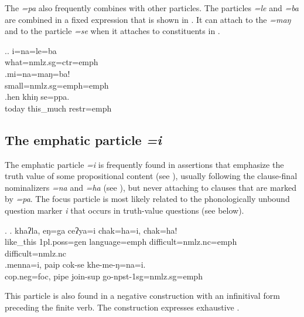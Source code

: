  The   \emph{=pa} also frequently combines with other particles. The particles \emph{=le} and \emph{=ba} are combined in a fixed expression that is shown in \Next[a]. It can attach to the  \emph{=maŋ} and to the  particle \emph{=se} when it attaches to constituents in .
 
 \ex.\ag. i=na=le=ba\\
 	what{\sc =nmlz.sg=ctr=emph}\\ 
 \bg.mi=na=maŋ=ba!\\
small{\sc =nmlz.sg=emph=emph}\\
  
 \bg.hen khiŋ se=ppa.\\
 today this\_much {\sc restr=emph}\\
 
\subsection{The emphatic particle \emph{=i}} 
\largerpage[-1] 
 The emphatic  particle \emph{=i} is frequently found  in assertions that emphasize the truth value of some propositional content (see \Next ), usually following the clause-final nominalizers \emph{=na} and \emph{=ha} (see ), but never attaching to clauses that are marked by \emph{=pa}. The focus particle is most likely related to the phonologically unbound question marker \emph{i} that occurs in truth-value questions (see below).

 
 \ex. \ag. khaʔla,  eŋ=ga              ceʔya=i   chak=ha=i, chak=ha!\\
	 like\_this {\sc 1pl.poss=gen} language{\sc =emph} difficult{\sc =nmlz.nc=emph} difficult{\sc =nmlz.nc}  \\
	  
	 	 \bg.menna=i, paip cok-se khe-me-ŋ=na=i.\\
	 {\sc cop.neg=foc}, pipe join{\sc -sup} go{\sc -npst-1sg=nmlz.sg=emph}\\
	
	
This  particle is also found in a negative construction with an infinitival form preceding the finite verb. The construction expresses exhaustive  .
	
